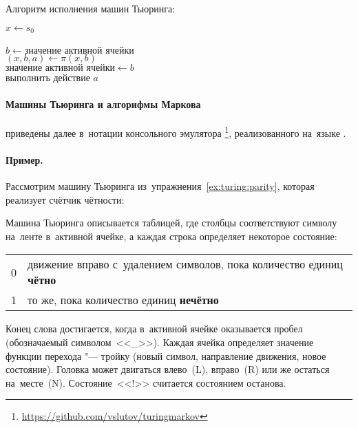 Алгоритм исполнения машин Тьюринга:
\begin{tabbing}
  \(x \leftarrow s_0\) \\
   \\
  \quad\= \(b\leftarrow \text{значение активной ячейки}\) \\
  \> \(\left(x, b, a\right)\leftarrow \pi\left(x, b\right)\) \\
  \> \(\text{значение активной ячейки}\leftarrow b\) \\
  \> выполнить действие \(a\) \\
\end{tabbing}



\paragraph{Машины Тьюринга и алгорифмы Маркова}
приведены далее в~нотации консольного эмулятора \footnote{\url{https://github.com/vslutov/turingmarkov}}, реализованного на~языке .



\paragraph{Пример.}
Рассмотрим машину Тьюринга из~упражнения~\ref{ex:turing:parity}, которая реализует счётчик чётности:

Машина Тьюринга описывается таблицей, где столбцы соответствуют символу на~ленте в~активной ячейке, а каждая строка определяет некоторое состояние:
\begin{flushleft}\begin{tabular}{l@{~~--~~}l}
  0 & движение вправо с~удалением символов, пока количество единиц \textbf{чётно} \\
  1 & то же, пока количество единиц \textbf{нечётно} \\
\end{tabular}\end{flushleft}

Конец слова достигается, когда в~активной ячейке оказывается пробел (обозначаемый символом~<<\_>>). Каждая ячейка определяет значение функции перехода "--- тройку (новый символ, направление движения, новое состояние). Головка может двигаться влево~(L), вправо~(R) или же остаться на~месте~(N). Состояние~<<!>> считается состоянием останова.



